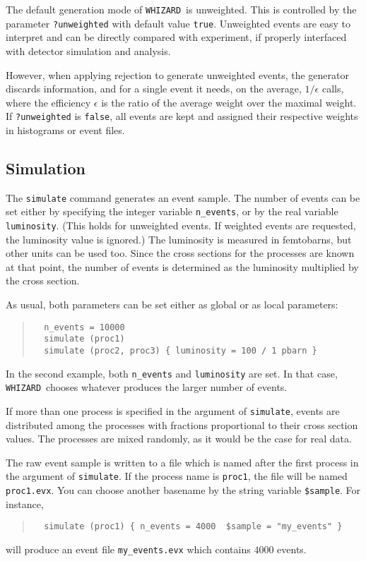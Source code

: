 \documentclass[12pt]{book}
\newcommand{\ttt}[1]{\texttt{#1}}
\newcommand{\whizard}{\texttt{WHIZARD}}
\begin{document}
The default generation mode of \whizard\ is unweighted.  This is controlled by
the parameter \verb|?unweighted| with default value \ttt{true}.  Unweighted
events are easy to interpret and can be directly compared with experiment, if
properly interfaced with detector simulation and analysis.

However, when applying rejection to generate unweighted events, the generator
discards information, and for a single event it needs, on the average,
$1/\epsilon$ calls, where the efficiency $\epsilon$ is the ratio of the
average weight over the maximal weight.  If \verb|?unweighted| is \ttt{false},
all events are kept and assigned their respective weights in histograms or
event files.


\subsection{Simulation}
\label{sec:simulation}

The \ttt{simulate} command generates an event sample.  The number of events
can be set either by specifying the integer variable \verb|n_events|, or by
the real variable \verb|luminosity|.  (This holds for unweighted events.  If
weighted events are requested, the luminosity value is ignored.)  The
luminosity is measured in 
femtobarns, but other units can be used too.  Since the cross sections for the
processes are known at that point, the number of events is determined as the
luminosity multiplied by the cross section.

As usual, both parameters can be set either as global or as local parameters:
\begin{quote}
\begin{footnotesize}
\begin{verbatim}
  n_events = 10000
  simulate (proc1)
  simulate (proc2, proc3) { luminosity = 100 / 1 pbarn }
\end{verbatim}
\end{footnotesize}
\end{quote}
In the second example, both \verb|n_events| and \verb|luminosity| are set.  
In that case, \whizard\ chooses whatever produces the larger number of events.

If more than one process is specified in the argument of \ttt{simulate},
events are distributed among the processes with fractions proportional to
their cross section values.  The processes are mixed randomly, as it would be
the case for real data.

The raw event sample is written to a file which is named after the first process
in the argument of \ttt{simulate}.  If the process name is \ttt{proc1}, the
file will be named \ttt{proc1.evx}.  You can choose another basename by the
string variable \verb|$sample|.  For instance,
\begin{quote}
\begin{footnotesize}
\begin{verbatim}
  simulate (proc1) { n_events = 4000  $sample = "my_events" }
\end{verbatim}
\end{footnotesize}
\end{quote}
will produce an event file \verb|my_events.evx| which contains $4000$ events.
\end{document}

